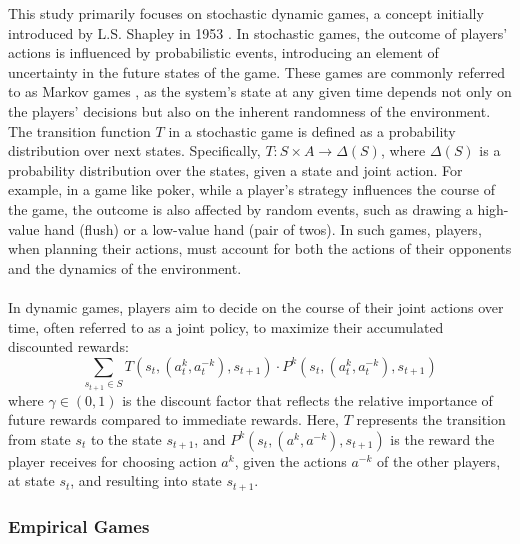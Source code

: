 \begin{flushleft}
    This study primarily focuses on stochastic dynamic games, a concept initially introduced by L.S. Shapley in 1953 \cite{Shapley1953StochasticG}. In stochastic games, the outcome of players' actions is influenced by probabilistic events, introducing an element of uncertainty in the future states of the game. These games are commonly referred to as Markov games \cite{Shoham_Leyton-Brown_2008}, as the system's state at any given time depends not only on the players' decisions but also on the inherent randomness of the environment. The transition function $T$ in a stochastic game is defined as a probability distribution over next states. Specifically, $T: S \times A \to \Delta(S)$, where $\Delta(S)$ is a probability distribution over the states, given a state and joint action. For example, in a game like poker, while a player's strategy influences the course of the game, the outcome is also affected by random events, such as drawing a high-value hand (flush) or a low-value hand (pair of twos). In such games, players, when planning their actions, must account for both the actions of their opponents and the dynamics of the environment.\\~\\

    In dynamic games, players aim to decide on the course of their joint actions over time, often referred to as a joint policy, to maximize their accumulated discounted rewards:
    \begin{equation}
        \sum_{s_{t+1} \in S} T(s_t, (a_t^k, a_t^{-k}), s_{t+1}) \cdot P^k(s_t, (a_t^k, a_t^{-k}), s_{t+1})
        \label{eq:acc_rewards}
    \end{equation}      
    where $\gamma \in (0, 1)$ is the discount factor that reflects the relative importance of future rewards compared to immediate rewards. Here, $T$ represents the transition from state $s_t$ to the state $s_{t+1}$, and $P^k(s_{t}, (a^k, a^{-k}), s_{t+1})$ is the reward the player receives for choosing action $a^k$, given the actions $a^{-k}$ of the other players, at state $s_{t}$, and resulting into state $s_{t+1}$.

\end{flushleft}

\subsubsection{Empirical Games}

